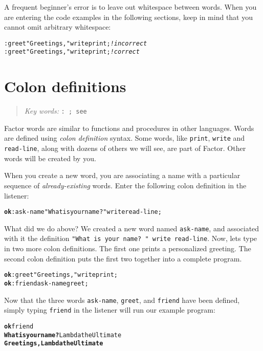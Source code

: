 \documentclass[english]{book}
\newcommand{\chapkeywords}[1]{%
\begin{quote}
\emph{Key words:} \texttt{#1}
\end{quote}
}
\begin{document}
A frequent beginner's error is to leave out whitespace between words. When you are entering the code examples in the following sections, keep in mind that you cannot omit arbitrary whitespace:

\begin{alltt}
:greet "Greetings, " write print; \emph{! incorrect}
: greet "Greetings, " write print ; \emph{! correct}
\end{alltt}

\section{Colon definitions}

\chapkeywords{:~; see}
\index{\texttt{:}}
\index{\texttt{;}}

Factor words are similar to functions and procedures in other languages. Words are defined using \emph{colon definition} syntax. Some words, like \texttt{print}, \texttt{write} and  \texttt{read-line}, along with dozens of others we will see, are part of Factor. Other words will be created by you.

When you create a new word, you are associating a name with a particular sequence of \emph{already-existing} words. Enter the following colon definition in the listener:

\begin{alltt}
\textbf{ok} : ask-name "What is your name? " write read-line ;
\end{alltt}

What did we do above? We created a new word named \texttt{ask-name}, and associated with it the definition \texttt{"What is your name? " write read-line}. Now, lets type in two more colon definitions. The first one prints a personalized greeting. The second colon definition puts the first two together into a complete program.

\begin{alltt}
\textbf{ok} : greet "Greetings, " write print ;
\textbf{ok} : friend ask-name greet ;
\end{alltt}

Now that the three words \texttt{ask-name}, \texttt{greet}, and \texttt{friend} have been defined, simply typing \texttt{friend} in the listener will run our example program:

\begin{alltt}
\textbf{ok} friend
\textbf{What is your name? }Lambda the Ultimate
\textbf{Greetings, Lambda the Ultimate}
\end{alltt}
\end{document}
